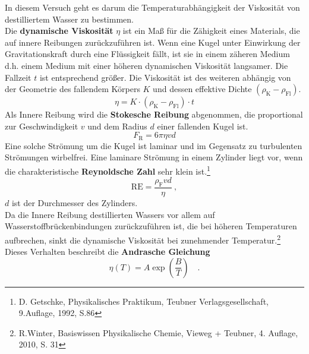In diesem Versuch geht es darum die Temperaturabhängigkeit der Viskosität von destilliertem Wasser zu bestimmen. \\
Die \textbf{dynamische Viskosität} $\eta$ ist ein Maß für die Zähigkeit eines Materials, die auf innere Reibungen zurückzuführen ist. Wenn eine Kugel unter Einwirkung der Gravitationskraft durch eine Flüssigkeit fällt, ist sie in einem zäheren Medium d.h. einem Medium mit einer höheren dynamischen Viskosität langsamer. Die Fallzeit $t$ ist entsprechend größer. Die Viskosität ist des weiteren abhängig von der Geometrie des fallendem Körpers $K$ und dessen effektive Dichte $ (\rho_\text{K}-\rho_\text{Fl}) $.
\begin{equation}
\label{Visk}
\eta = K \cdot (\rho_\text{K} - \rho_\text{Fl}) \cdot  t
\end{equation}
Als Innere Reibung wird die \textbf{Stokesche Reibung} abgenommen, die proportional zur Geschwindigkeit $v$ und dem Radius $d$ einer fallenden Kugel ist.
\begin{equation}
F_\text{R} = 6\pi \eta v d
\end{equation}
Eine solche Strömung um die Kugel ist laminar und im Gegensatz zu turbulenten Strömungen wirbelfrei. Eine laminare Strömung in einem Zylinder liegt vor, wenn die charakteristische \textbf{Reynoldsche Zahl} sehr klein ist.\footnote{D. Getschke, Physikalisches Praktikum, Teubner Verlagsgesellschaft, 9.Auflage, 1992, S.86}
\begin{equation}
\label{Reynolds}
\text{RE} = \frac{\rho_\text{F} v d}{\eta} \ ,
\end{equation}
$d$ ist der Durchmesser des Zylinders. \\
Da die Innere Reibung destillierten Wassers vor allem auf Wasserstoffbrückenbindungen zurückzuführen ist, die bei höheren Temperaturen aufbrechen, sinkt die dynamische Viskosität bei zunehmender Temperatur.\footnote{R.Winter, Basiswissen Physikalische Chemie, Vieweg + Teubner, 4. Auflage, 2010, S. 31} Dieses Verhalten beschreibt die \textbf{Andrasche Gleichung}
\begin{equation}
\label{Andra}
\eta(T) = A \exp \left(\frac{B}{T}\right) \quad.
\end{equation}